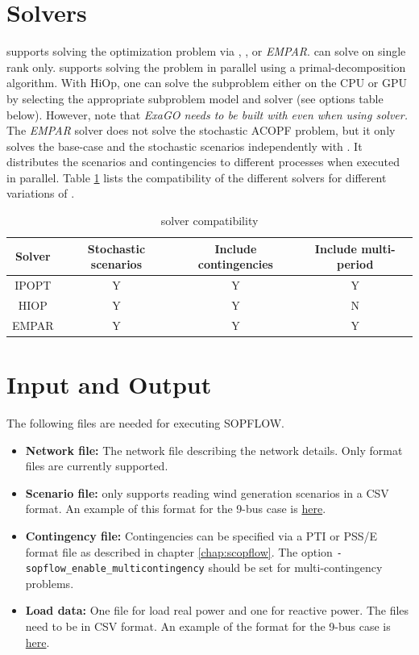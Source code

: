 \section{Solvers}
\sopflow supports solving the optimization problem via \ipopt, \hiop, or \emph{EMPAR}. \ipopt can solve \sopflow on single rank only. \hiop supports solving the problem in parallel using a primal-decomposition algorithm. With HiOp, one can solve the subproblem either on the CPU or GPU by selecting the appropriate subproblem model and solver (see options table below). However, note that \emph{ExaGO needs to be built with \ipopt even when using \hiop solver.} The \emph{EMPAR} solver does not solve the stochastic ACOPF problem, but it only solves the base-case and the stochastic scenarios independently with \opflow. It distributes the scenarios and contingencies to different processes when executed in parallel. Table \ref{tab:sopflow_solvers} lists the compatibility of the different solvers for different variations of \sopflow.

\begin{center}
\begin{table}[!htbp]
    \centering
    \caption{\sopflow solver compatibility}
    \begin{tabular}{|c|c|c|c|}
      \hline
      \textbf{Solver} & \textbf{Stochastic scenarios} & \textbf{Include contingencies} & \textbf{Include multi-period} \\
      \hline
      IPOPT   & Y & Y & Y \\ \hline
      HIOP & Y & Y  & N \\ \hline
      EMPAR  & Y & Y  & Y \\ \hline
    \end{tabular}
    \label{tab:sopflow_solvers}
\end{table}
\end{center}


\section{Input and Output}
The following files are needed for executing SOPFLOW.
\begin{itemize}
    \item \textbf{Network file:} The network file describing the network details. Only \matpower format files are currently supported.
    \item \textbf{Scenario file:} \sopflow only supports reading wind generation scenarios in a CSV format. An example of this format for the 9-bus case is \href{https://github.com/ORNL/ExaGO/tree/develop/datafiles/case9/scenarios_9bus.csv}{here}.
    \item \textbf{Contingency file:} Contingencies can be specified
      via a PTI or PSS/E format file as described in chapter \ref{chap:scopflow}. The option \lstinline{-sopflow_enable_multicontingency} should be set for multi-contingency problems.
    \item \textbf{Load data:} One file for load real power and one for reactive power. The files need to be in CSV format. An example of the format for the 9-bus case is \href{https://github.com/ORNL/ExaGO/tree/develop/datafiles/case9}{here}.
\end{itemize}

